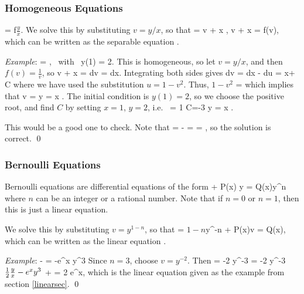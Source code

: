 \documentclass[12pt]{article}
\begin{document}
\subsubsection{Homogeneous Equations}
\be 
{} = f\(\frac{y}{x}\).
\ee
We solve this by substituting $v=y/x$, so that
\be 
{} = v + x ,
\quad \implies \quad
v + x  = f(v),
\ee
which can be written as the separable equation
\be
{}.
\ee

\noindent \emph{Example}:
\be 
{} = , \mbox{ with } y(1) = 2.
\ee
This is homogeneous, so let $v=y/x$, and then $f(v) = \frac{1}{v}$, so
\be 
v + x  =  
\quad \implies \quad
{} dv = dx.
\ee
Integrating both sides gives
\be 
\int {}dv = \int {} dx
\quad \implies \quad
- \int {}du = \ln x+ \ln C
\ee
where we have used the substitution $u = 1-v^2$. Thus,
\be 
\ln\(1-v^2 \) = \ln {}
\ee
which implies that 
\be 
v = \pm {} 
\quad \implies \quad 
y = \pm x .
\ee
The initial condition is $y(1)=2$, so we choose the positive root, and
find $C$ by setting $x=1$, $y=2$, i.e.\
 = 1 \times {} 
\quad \implies \quad 
C=-3
\quad \implies \quad 
y = x .
\ee

This would be a good one to check. Note that 
\be 
{} =  - 
= \frac{1}{\sqrt{1+\frac{3}{x^2}}}
= , 
\ee
so the solution is correct. \qed

\subsubsection{Bernoulli Equations}
Bernoulli equations are differential equations of the form
\be 
{} + P(x) y = Q(x)y^n
\ee
where $n$ can be an integer or a rational number. Note that if
$n=0$ or $n=1$, then this is just a linear equation.

We solve this by substituting $v=y^{1-n}$, so that
\be 
{} = \(1-n\)y^{-n}
\quad \implies \quad
{}  + P(x)v = Q(x),
\ee
which can be written as the linear equation
\be
{}.
\ee

\noindent\emph{Example}:
\be 
{} -\half {} = -e^x y^3
\ee
Since $n=3$, choose $v=y^{-2}$. Then
\be 
{} = -2 y^{-3}  
\quad \implies \quad
{} = -2 y^{-3}\( \half \frac{y}{x}  - e^x y^3\)
\quad \implies \quad
{} +  = 2 e^x,
\ee
which is the linear equation given as the example from section \ref{linearsec}. 
\qed
\end{document}
